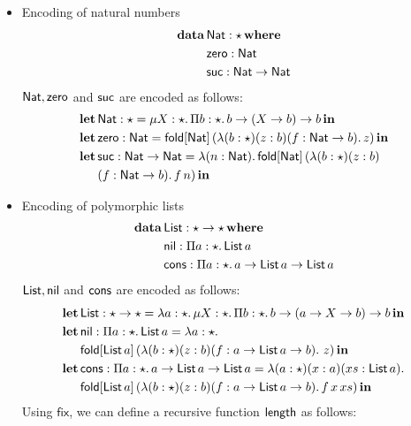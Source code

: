 \begin{itemize}

\item Encoding of natural numbers
  \begin{align*}
    \mathbf{data}\,&\mathsf{Nat} : \star\,\mathbf{where} \\
           &\mathsf{zero} : \mathsf{Nat} \\
           &\mathsf{suc} : \mathsf{Nat} \rightarrow \mathsf{Nat}
  \end{align*}
  $\mathsf{Nat},\mathsf{zero}$ and $\mathsf{suc}$ are encoded as follows:
  \begin{align*}
    \mathbf{let}\,&\mathsf{Nat} : \star = \mu X:\star.\,\Pi b:\star.\,b \rightarrow (X \rightarrow b) \rightarrow b\,\mathbf{in} \\
    \mathbf{let}\,&\mathsf{zero} : \mathsf{Nat} = \mathsf{fold}[\mathsf{Nat}]\,(\lambda (b : \star) (z : b) (f : \mathsf{Nat} \rightarrow b).\,z)\,\mathbf{in} \\
    \mathbf{let}\,&\mathsf{suc} : \mathsf{Nat} \rightarrow \mathsf{Nat} = \lambda (n : \mathsf{Nat}).\,\mathsf{fold}[\mathsf{Nat}]\,(\lambda (b : \star) (z : b)\\ &(f : \mathsf{Nat} \rightarrow b).\,f\,n)\,\mathbf{in}
  \end{align*}
\item Encoding of polymorphic lists
  \begin{align*}
    \mathbf{data}\,&\mathsf{List} : \star \rightarrow \star\,\mathbf{where} \\
           &\mathsf{nil} : \Pi a:\star.\,\mathsf{List}\,a \\
           &\mathsf{cons} : \Pi a:\star.\,a \rightarrow \mathsf{List}\,a \rightarrow \mathsf{List}\,a
  \end{align*}
  $\mathsf{List},\mathsf{nil}$ and $\mathsf{cons}$ are encoded as follows:
  \begin{align*}
    \mathbf{let}\,&\mathsf{List} : \star \rightarrow \star = \lambda a:\star.\,\mu X:\star.\,\Pi b:\star.\,b \rightarrow (a \rightarrow X \rightarrow b) \rightarrow b\,\mathbf{in} \\
    \mathbf{let}\,&\mathsf{nil} : \Pi a:\star.\,\mathsf{List}\,a = \lambda a : \star.\\
            &\mathsf{fold}[\mathsf{List}\,a]\,(\lambda (b : \star) (z : b) (f : a \rightarrow \mathsf{List}\,a \rightarrow b).\ z)\,\mathbf{in} \\
    \mathbf{let}\,&\mathsf{cons} : \Pi a:\star.\,a \rightarrow \mathsf{List}\,a \rightarrow \mathsf{List}\,a = \lambda(a:\star)(x : a)(xs : \mathsf{List}\,a).\\
            &\mathsf{fold}[\mathsf{List}\,a]\,(\lambda(b : \star)(z : b)(f : a \rightarrow \mathsf{List}\,a \rightarrow b).\,f\,x\,xs)\,\mathbf{in}
  \end{align*}
  Using $\mathsf{fix}$, we can define a recursive function $\mathsf{length}$
  as follows:
  \begin{align*}

\end{align*}
\end{itemize}
